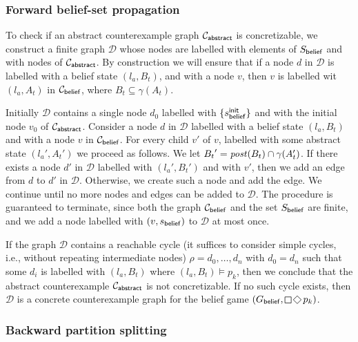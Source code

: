 \subsubsection{Forward belief-set propagation}

To check if an abstract counterexample graph $\mathcal{C}_{\mathsf{abstract}}$ is concretizable, we construct a finite graph $\mathcal{D}$ whose nodes are labelled with elements of $S_{\mathsf{belief}}$ and with nodes of $\mathcal{C}_{\mathsf{abstract}}$.
By construction we will ensure that if a node $d$ in $\mathcal D$ is labelled with a belief state $(l_a,B_t)$, and with a node $v$, then $v$ is labelled wit $(l_a,A_t)$ in $\mathcal{C}_{\mathsf{belief}}$, where $B_t \subseteq \gamma(A_t)$. 

Initially $\mathcal D$ contains a single node $d_0$ labelled with $\{s_{\mathsf{belief}}^{\mathsf{init}}\}$ and with the initial node $v_0$ of $\mathcal{C}_{\mathsf{abstract}}$. Consider a node $d$ in $\mathcal D$ labelled with a belief state $(l_a,B_t)$ and with a node $v$ in $\mathcal{C}_{\mathsf{belief}}$. For every child $v'$ of $v$, labelled with some abstract state $(l_a',A_t')$ we proceed as follows. We let ${B_t}' = \mathit{post}(B_t) \cap \gamma(A_t')$. If there exists a node $d'$ in $\mathcal D$ labelled with $(l_a',B_t')$ and with $v'$, then we add an edge from $d$ to $d'$ in $\mathcal{D}$. Otherwise, we create such a node and add the edge. We continue until no more nodes and edges can be added to $\mathcal D$. The procedure is guaranteed to terminate, since both the graph $\mathcal{C}_{\mathsf{belief}}$ and the set $S_{\mathsf{belief}}$ are finite, and we add a node labelled with $(v,s_{\mathsf{belief}})$ to $\mathcal D$ at most once.

If the graph $\mathcal D$ contains a reachable cycle (it suffices to consider simple cycles, i.e., without repeating intermediate nodes) $\rho = d_0,\ldots,d_n$ with $d_0 = d_n$ such that some $d_i$ is labelled with $(l_a,B_t)$ where $(l_a,B_t) \models p_k$, then we conclude that the abstract counterexample $\mathcal{C}_{\mathsf{abstract}}$ is not concretizable. If no such cycle exists, then $\mathcal D$ is a concrete counterexample graph for the belief game $(G_\belief,\LTLglobally\LTLfinally p_k)$. 


\begin{theorem}
\end{theorem}

\subsubsection{Backward partition splitting}

